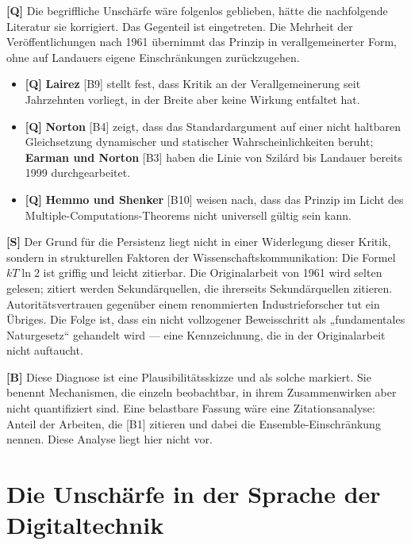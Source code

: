 \textbf{[Q]} Die begriffliche Unschärfe wäre folgenlos geblieben, hätte die nachfolgende
Literatur sie korrigiert. Das Gegenteil ist eingetreten. Die Mehrheit der
Veröffentlichungen nach 1961 übernimmt das Prinzip in verallgemeinerter Form, ohne
auf Landauers eigene Einschränkungen zurückzugehen.

\begin{itemize}[leftmargin=1.4em,itemsep=0.3em]
  \item \textbf{[Q]} \textbf{Lairez} [B9] stellt fest, dass Kritik an der Verallgemeinerung
        seit Jahrzehnten vorliegt, in der Breite aber keine Wirkung entfaltet hat.
  \item \textbf{[Q]} \textbf{Norton} [B4] zeigt, dass das Standardargument auf einer nicht
        haltbaren Gleichsetzung dynamischer und statischer Wahrscheinlichkeiten
        beruht; \textbf{Earman und Norton} [B3] haben die Linie von Szilárd bis
        Landauer bereits 1999 durchgearbeitet.
  \item \textbf{[Q]} \textbf{Hemmo und Shenker} [B10] weisen nach, dass das Prinzip im
        Licht des Multiple-Computations-Theorems nicht universell gültig sein kann.
\end{itemize}

\textbf{[S]} Der Grund für die Persistenz liegt nicht in einer Widerlegung dieser Kritik,
sondern in strukturellen Faktoren der Wissenschaftskommunikation: Die Formel
$kT\ln 2$ ist griffig und leicht zitierbar. Die Originalarbeit von 1961 wird selten
gelesen; zitiert werden Sekundärquellen, die ihrerseits Sekundärquellen zitieren.
Autoritätsvertrauen gegenüber einem renommierten Industrieforscher tut ein
Übriges. Die Folge ist, dass ein nicht vollzogener Beweisschritt als
„fundamentales Naturgesetz“ gehandelt wird --- eine Kennzeichnung, die in der
Originalarbeit nicht auftaucht.

\textbf{[B]} Diese Diagnose ist eine Plausibilitätsskizze und als solche markiert. Sie
benennt Mechanismen, die einzeln beobachtbar, in ihrem Zusammenwirken aber nicht
quantifiziert sind. Eine belastbare Fassung wäre eine Zitationsanalyse: Anteil der
Arbeiten, die [B1] zitieren und dabei die Ensemble-Einschränkung nennen. Diese
Analyse liegt hier nicht vor.

\section{Die Unschärfe in der Sprache der Digitaltechnik}

